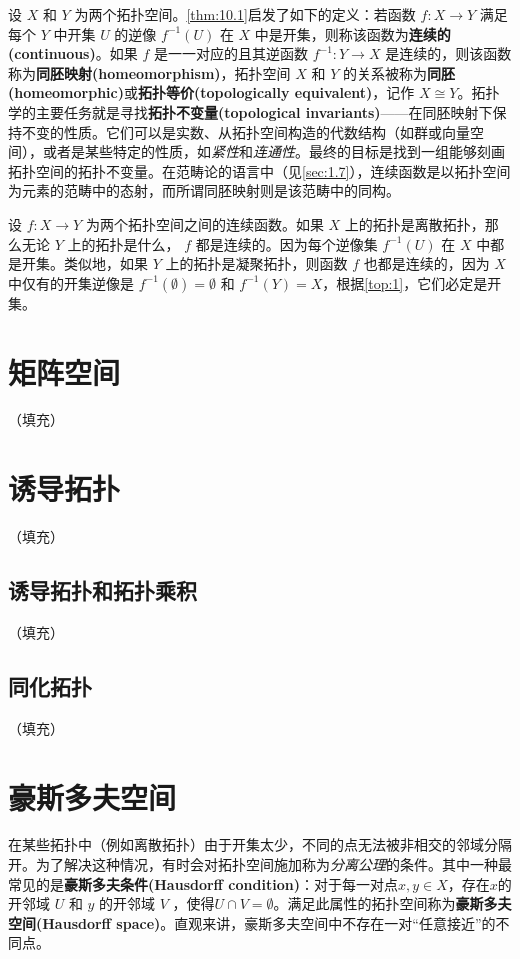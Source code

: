 \begin{theorem}
\begin{theorem}
	设 $X$ 和 $Y$ 为两个拓扑空间。\ref{thm:10.1}启发了如下的定义：若函数 $f:X\rightarrow Y$ 满足每个 $Y$ 中开集 $U$ 的逆像 $f^{-1} (U)$ 在 $X$ 中是开集，则称该函数为\textbf{连续的(continuous)}。如果 $f$ 是一一对应的且其逆函数 $f^{-1} :Y\rightarrow X$ 是连续的，则该函数称为\textbf{同胚映射(homeomorphism)}，拓扑空间 $X$ 和 $Y$ 的关系被称为\textbf{同胚(homeomorphic)}或\textbf{拓扑等价(topologically equivalent)}，记作 $X\cong Y$。拓扑学的主要任务就是寻找\textbf{拓扑不变量(topological invariants)}——在同胚映射下保持不变的性质。它们可以是实数、从拓扑空间构造的代数结构（如群或向量空间），或者是某些特定的性质，如\emph{紧性}和\emph{连通性}。最终的目标是找到一组能够刻画拓扑空间的拓扑不变量。在范畴论的语言中（见\ref{sec:1.7}），连续函数是以拓扑空间为元素的范畴中的态射，而所谓同胚映射则是该范畴中的同构。

\begin{eg}\label{eg:10.10}
	设 $f:X\rightarrow Y$ 为两个拓扑空间之间的连续函数。如果 $X$ 上的拓扑是离散拓扑，那么无论 $Y$ 上的拓扑是什么， $f$ 都是连续的。因为每个逆像集 $f^{-1} (U)$ 在 $X$ 中都是开集。类似地，如果 $Y$ 上的拓扑是凝聚拓扑，则函数 $f$ 也都是连续的，因为 $X$ 中仅有的开集逆像是 $f^{-1} (\emptyset )=\emptyset $ 和 $f^{-1} (Y)=X$，根据\ref{top:1}，它们必定是开集。
\end{eg}

\section{矩阵空间}
（填充）
\section{诱导拓扑}
（填充）
\subsection{诱导拓扑和拓扑乘积}
（填充）
\subsection{同化拓扑}
（填充）
\section{豪斯多夫空间}

在某些拓扑中（例如离散拓扑）由于开集太少，不同的点无法被非相交的邻域分隔开。为了解决这种情况，有时会对拓扑空间施加称为\emph{分离公理}的条件。其中一种最常见的是\textbf{豪斯多夫条件(Hausdorff condition)}：对于每一对点$x,y\in X$，存在$x$的开邻域 $U$ 和 $y$ 的开邻域 $V$ ，使得$U\cap V=\emptyset $。满足此属性的拓扑空间称为\textbf{豪斯多夫空间(Hausdorff space)}。直观来讲，豪斯多夫空间中不存在一对“任意接近”的不同点。


\end{theorem}
\end{theorem}

